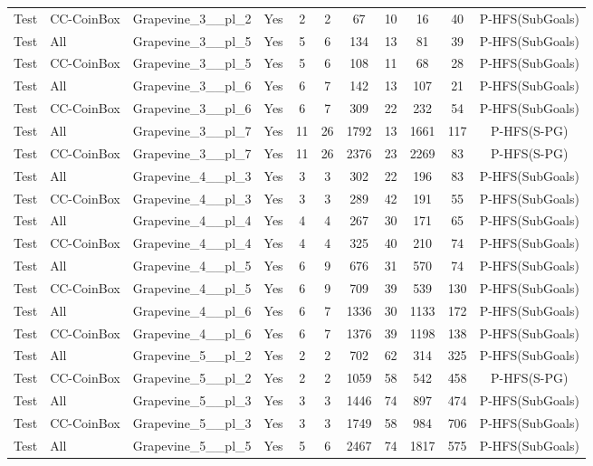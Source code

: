 \documentclass{article}
\begin{document}
\begin{tabular}{lllcccccccc}
Test & CC-CoinBox & Grapevine\_3\_\_pl\_2 & Yes & 2 & 2 & 67 & 10 & 16 & 40 & P-HFS(SubGoals) \\
Test & All & Grapevine\_3\_\_pl\_5 & Yes & 5 & 6 & 134 & 13 & 81 & 39 & P-HFS(SubGoals) \\
Test & CC-CoinBox & Grapevine\_3\_\_pl\_5 & Yes & 5 & 6 & 108 & 11 & 68 & 28 & P-HFS(SubGoals) \\
Test & All & Grapevine\_3\_\_pl\_6 & Yes & 6 & 7 & 142 & 13 & 107 & 21 & P-HFS(SubGoals) \\
Test & CC-CoinBox & Grapevine\_3\_\_pl\_6 & Yes & 6 & 7 & 309 & 22 & 232 & 54 & P-HFS(SubGoals) \\
Test & All & Grapevine\_3\_\_pl\_7 & Yes & 11 & 26 & 1792 & 13 & 1661 & 117 & P-HFS(S-PG) \\
Test & CC-CoinBox & Grapevine\_3\_\_pl\_7 & Yes & 11 & 26 & 2376 & 23 & 2269 & 83 & P-HFS(S-PG) \\
Test & All & Grapevine\_4\_\_pl\_3 & Yes & 3 & 3 & 302 & 22 & 196 & 83 & P-HFS(SubGoals) \\
Test & CC-CoinBox & Grapevine\_4\_\_pl\_3 & Yes & 3 & 3 & 289 & 42 & 191 & 55 & P-HFS(SubGoals) \\
Test & All & Grapevine\_4\_\_pl\_4 & Yes & 4 & 4 & 267 & 30 & 171 & 65 & P-HFS(SubGoals) \\
Test & CC-CoinBox & Grapevine\_4\_\_pl\_4 & Yes & 4 & 4 & 325 & 40 & 210 & 74 & P-HFS(SubGoals) \\
Test & All & Grapevine\_4\_\_pl\_5 & Yes & 6 & 9 & 676 & 31 & 570 & 74 & P-HFS(SubGoals) \\
Test & CC-CoinBox & Grapevine\_4\_\_pl\_5 & Yes & 6 & 9 & 709 & 39 & 539 & 130 & P-HFS(SubGoals) \\
Test & All & Grapevine\_4\_\_pl\_6 & Yes & 6 & 7 & 1336 & 30 & 1133 & 172 & P-HFS(SubGoals) \\
Test & CC-CoinBox & Grapevine\_4\_\_pl\_6 & Yes & 6 & 7 & 1376 & 39 & 1198 & 138 & P-HFS(SubGoals) \\
Test & All & Grapevine\_5\_\_pl\_2 & Yes & 2 & 2 & 702 & 62 & 314 & 325 & P-HFS(SubGoals) \\
Test & CC-CoinBox & Grapevine\_5\_\_pl\_2 & Yes & 2 & 2 & 1059 & 58 & 542 & 458 & P-HFS(S-PG) \\
Test & All & Grapevine\_5\_\_pl\_3 & Yes & 3 & 3 & 1446 & 74 & 897 & 474 & P-HFS(SubGoals) \\
Test & CC-CoinBox & Grapevine\_5\_\_pl\_3 & Yes & 3 & 3 & 1749 & 58 & 984 & 706 & P-HFS(SubGoals) \\
Test & All & Grapevine\_5\_\_pl\_5 & Yes & 5 & 6 & 2467 & 74 & 1817 & 575 & P-HFS(SubGoals) \\

\end{tabular}
\end{document}
